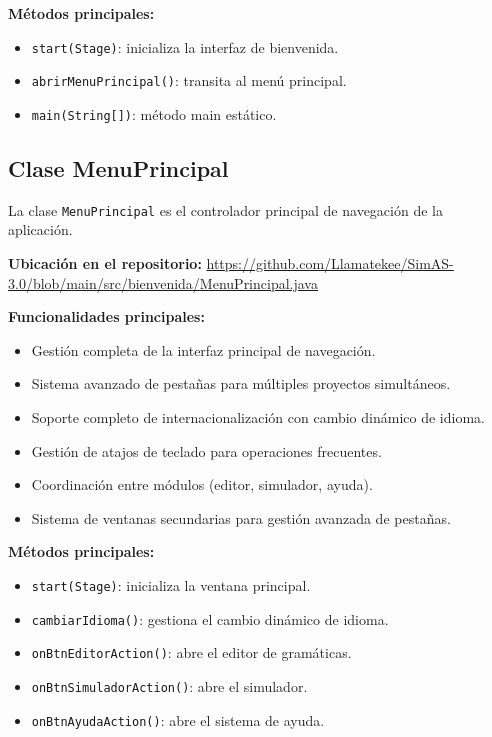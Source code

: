 \textbf{Métodos principales:}
\begin{itemize}
    \item \texttt{start(Stage)}: inicializa la interfaz de bienvenida.
    \item \texttt{abrirMenuPrincipal()}: transita al menú principal.
    \item \texttt{main(String[])}: método main estático.
\end{itemize}

\subsection{Clase MenuPrincipal}

La clase \texttt{MenuPrincipal} es el controlador principal de navegación de la aplicación.

\textbf{Ubicación en el repositorio:} \url{https://github.com/Llamatekee/SimAS-3.0/blob/main/src/bienvenida/MenuPrincipal.java}

\textbf{Funcionalidades principales:}

\begin{itemize}
    \item Gestión completa de la interfaz principal de navegación.
    \item Sistema avanzado de pestañas para múltiples proyectos simultáneos.
    \item Soporte completo de internacionalización con cambio dinámico de idioma.
    \item Gestión de atajos de teclado para operaciones frecuentes.
    \item Coordinación entre módulos (editor, simulador, ayuda).
    \item Sistema de ventanas secundarias para gestión avanzada de pestañas.
\end{itemize}

\textbf{Métodos principales:}
\begin{itemize}
    \item \texttt{start(Stage)}: inicializa la ventana principal.
    \item \texttt{cambiarIdioma()}: gestiona el cambio dinámico de idioma.
    \item \texttt{onBtnEditorAction()}: abre el editor de gramáticas.
    \item \texttt{onBtnSimuladorAction()}: abre el simulador.
    \item \texttt{onBtnAyudaAction()}: abre el sistema de ayuda.
\end{itemize}

